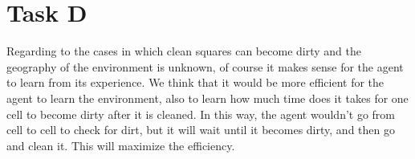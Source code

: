 
\section{Task D}
Regarding to the cases in which clean squares can become dirty and the geography
of the environment is unknown, of course it makes sense for the agent to learn
from its experience. We think that it would be more efficient for the agent to
learn the environment, also to learn how much time does it takes for one cell to
become dirty after it is cleaned. In this way, the agent wouldn't go from cell
to cell to check for dirt, but it will wait until it becomes dirty, and then go
and clean it. This will  maximize the efficiency.
